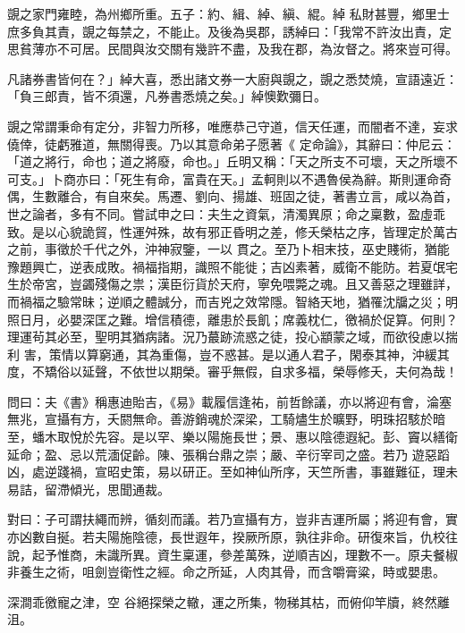 \begin{pinyinscope}
 覬之家門雍睦，為州鄉所重。五子：約、緝、綽、縝、緄。綽
 私財甚豐，鄉里士庶多負其責，覬之每禁之，不能止。及後為吳郡，誘綽曰：「我常不許汝出責，定思貧薄亦不可居。民間與汝交關有幾許不盡，及我在郡，為汝督之。將來豈可得。



 凡諸券書皆何在？」綽大喜，悉出諸文券一大廚與覬之，覬之悉焚燒，宣語遠近：「負三郎責，皆不須還，凡券書悉燒之矣。」綽懊歎彌日。



 覬之常謂秉命有定分，非智力所移，唯應恭己守道，信天任運，而闇者不達，妄求僥倖，徒虧雅道，無關得喪。乃以其意命弟子愿著《
 定命論》，其辭曰：仲尼云：「道之將行，命也；道之將廢，命也。」丘明又稱：「天之所支不可壞，天之所壞不可支。」卜商亦曰：「死生有命，富貴在天。」孟軻則以不遇魯侯為辭。斯則運命奇偶，生數離合，有自來矣。馬遷、劉向、揚雄、班固之徒，著書立言，咸以為首，世之論者，多有不同。嘗試申之曰：夫生之資氣，清濁異原；命之稟數，盈虛乖致。是以心貌詭貿，性運舛殊，故有邪正昏明之差，修夭榮枯之序，皆理定於萬古之前，事徵於千代之外，沖神寂鑒，一以
 貫之。至乃卜相末技，巫史賤術，猶能豫題興亡，逆表成敗。禍福指期，識照不能徙；吉凶素著，威衛不能防。若夏氓宅生於帝宮，豈蠲殘傷之祟；漢臣衍貨於天府，寧免喂斃之魂。且又善惡之理雖詳，而禍福之驗常昧；逆順之體誠分，而吉兇之效常隱。智絡天地，猶罹沈牖之災；明照日月，必嬰深匡之難。增信積德，離患於長飢；席義枕仁，徼禍於促算。何則？理運茍其必至，聖明其猶病諸。況乃蕞跡流惑之徒，投心顓蒙之域，而欲役慮以揣利
 害，策情以算窮通，其為重傷，豈不惑甚。是以通人君子，閑泰其神，沖緩其度，不矯俗以延聲，不依世以期榮。審乎無假，自求多福，榮辱修夭，夫何為哉！



 問曰：夫《書》稱惠迪貽吉，《易》載履信逢祐，前哲餘議，亦以將迎有會，淪塞無兆，宣攝有方，夭閼無命。善游銷魂於深梁，工騎燼生於曠野，明珠招駭於暗至，蟠木取悅於先容。是以罕、樂以陽施長世；景、惠以陰德遐紀。彭、竇以繕衛延命；盈、忌以荒湎促齡。陳、張稱台鼎之崇；嚴、辛衍宰司之盛。若乃
 遊惡蹈凶，處逆踐禍，宣昭史策，易以研正。至如神仙所序，天竺所書，事雖難征，理未易詰，留滯傾光，思聞通裁。



 對曰：子可謂扶繩而辨，循刻而議。若乃宣攝有方，豈非吉運所屬；將迎有會，實亦凶數自挻。若夫陽施陰德，長世遐年，揆厥所原，孰往非命。研復來旨，仇校往說，起予惟商，未識所異。資生稟運，參差萬殊，逆順吉凶，理數不一。原夫餐椒非養生之術，咀劍豈衛性之經。命之所延，人肉其骨，而含嚼膏粱，時或嬰患。



 深澗乖徼寵之津，空
 谷絕探榮之轍，運之所集，物稊其枯，而俯仰竿牘，終然離沮。




\end{pinyinscope}
